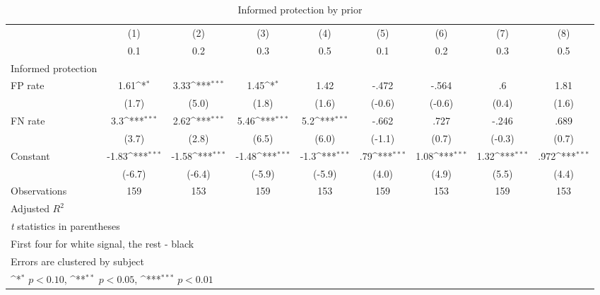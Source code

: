 \begin{table}[htbp]\centering
\def\sym#1{\ifmmode^{#1}\else\(^{#1}\)\fi}
\caption{Informed protection by prior}
\begin{tabular}{l*{8}{c}}
\hline\hline
                &\multicolumn{1}{c}{(1)}&\multicolumn{1}{c}{(2)}&\multicolumn{1}{c}{(3)}&\multicolumn{1}{c}{(4)}&\multicolumn{1}{c}{(5)}&\multicolumn{1}{c}{(6)}&\multicolumn{1}{c}{(7)}&\multicolumn{1}{c}{(8)}\\
                &\multicolumn{1}{c}{0.1}&\multicolumn{1}{c}{0.2}&\multicolumn{1}{c}{0.3}&\multicolumn{1}{c}{0.5}&\multicolumn{1}{c}{0.1}&\multicolumn{1}{c}{0.2}&\multicolumn{1}{c}{0.3}&\multicolumn{1}{c}{0.5}\\
\hline
Informed protection&                  &                  &                  &                  &                  &                  &                  &                  \\
FP rate         &     1.61\sym{*}  &     3.33\sym{***}&     1.45\sym{*}  &     1.42         &    -.472         &    -.564         &       .6         &     1.81         \\
                &    (1.7)         &    (5.0)         &    (1.8)         &    (1.6)         &   (-0.6)         &   (-0.6)         &    (0.4)         &    (1.6)         \\
FN rate         &      3.3\sym{***}&     2.62\sym{***}&     5.46\sym{***}&      5.2\sym{***}&    -.662         &     .727         &    -.246         &     .689         \\
                &    (3.7)         &    (2.8)         &    (6.5)         &    (6.0)         &   (-1.1)         &    (0.7)         &   (-0.3)         &    (0.7)         \\
Constant        &    -1.83\sym{***}&    -1.58\sym{***}&    -1.48\sym{***}&     -1.3\sym{***}&      .79\sym{***}&     1.08\sym{***}&     1.32\sym{***}&     .972\sym{***}\\
                &   (-6.7)         &   (-6.4)         &   (-5.9)         &   (-5.9)         &    (4.0)         &    (4.9)         &    (5.5)         &    (4.4)         \\
\hline
Observations    &      159         &      153         &      159         &      153         &      159         &      153         &      159         &      153         \\
Adjusted \(R^{2}\)&                  &                  &                  &                  &                  &                  &                  &                  \\
\hline\hline
\multicolumn{9}{l}{\footnotesize \textit{t} statistics in parentheses}\\
\multicolumn{9}{l}{\footnotesize First four for white signal, the rest - black}\\
\multicolumn{9}{l}{\footnotesize Errors are clustered by subject}\\
\multicolumn{9}{l}{\footnotesize \sym{*} \(p<0.10\), \sym{**} \(p<0.05\), \sym{***} \(p<0.01\)}\\
\end{tabular}
\end{table}
